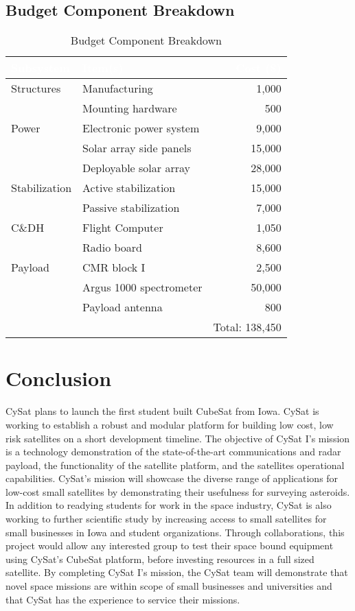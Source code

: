 \documentclass[nocover]            %
{CSLI}                       %
\begin{document}
\subsection{Budget Component Breakdown}
\begin{table}[H]
\centering
\caption{Budget Component Breakdown}
\begin{tabular}{| l | p{5cm} | r |}
\arrayrulecolor{white}
\hline
\rowcolor{gray!80}
\textcolor{white}{\textbf{Subsystem}} & \textcolor{white}{\textbf{Item(s)}} &  \textcolor{white}{\textbf{Cost (\$)}} \\ \hline
\rowcolor{gray!10}
Structures & Manufacturing&1,000 \\
\rowcolor{gray!10}
 &Mounting hardware &500 \\ \hline
\rowcolor{gray!5}
Power & Electronic power system & 9,000\\
\rowcolor{gray!5}
& Solar array side panels &15,000 \\
\rowcolor{gray!5}
& Deployable solar array & 28,000\\ \hline
\rowcolor{gray!10}
Stabilization & Active stabilization&15,000 \\ 
\rowcolor{gray!10}
&Passive stabilization &7,000 \\ \hline
\rowcolor{gray!5}
C\&DH& Flight Computer &1,050\\
\rowcolor{gray!5}
& Radio board& 8,600\\ \hline
\rowcolor{gray!10}
Payload & CMR block I &2,500 \\ 
\rowcolor{gray!10}
& Argus 1000 spectrometer &50,000 \\
\rowcolor{gray!10}
& Payload antenna & 800\\\hline
\rowcolor{gray!5}
 &  & Total: 138,450\\ \hline
\end{tabular}
\end{table}

\newpage
\section{Conclusion}
CySat plans to launch the first student built CubeSat from Iowa. CySat is working to establish a robust and modular platform for building low cost, low risk satellites on a short development timeline. The objective of CySat I's mission is a technology demonstration of the state-of-the-art communications and radar payload, the functionality of the satellite platform, and the satellites operational capabilities. CySat's mission will showcase the diverse range of applications for low-cost small satellites by demonstrating their usefulness for surveying asteroids. In addition to readying students for work in the space industry, CySat is also working to further scientific study by increasing access to small satellites for small businesses in Iowa and student organizations. Through collaborations, this project would allow any interested group to test their space bound equipment using CySat's CubeSat platform, before investing resources in a full sized satellite. By completing CySat I's mission, the CySat team will demonstrate that novel space missions are within scope of small businesses and universities and that CySat has the experience to service their missions.
\newpage
\end{document}
